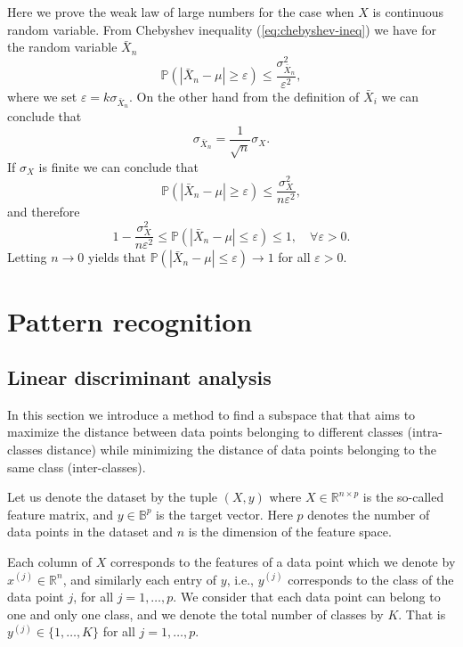 \documentclass[11pt]{article}
\newcommand{\R}{\mathbb{R}}
\newcommand{\B}{\mathbb{B}}
\newcommand{\Pro}{\mathbb{P}}
\begin{document}
Here we prove the weak law of large numbers for the case when $X$ is
continuous random variable. From Chebyshev inequality
(\ref{eq:chebyshev-ineq}) we have for the random variable $\bar{X}_n$
\begin{equation} 
  \Pro(|\bar{X}_n-\mu| \geq \varepsilon) \leq
  \frac{\sigma_{\bar{X}_n}^2}{\varepsilon^2},
\end{equation}
where we set $\varepsilon = k \sigma_{\bar{X}_n}$. On the other hand
from the definition of $\bar{X}_i$ we can conclude that
\begin{equation*}
  \sigma_{\bar{X}_n} = \frac{1}{\sqrt{n}} \sigma_X.
\end{equation*}
If $\sigma_X$ is finite we can conclude that
\begin{equation*} 
  \Pro(|\bar{X}_n-\mu| \geq \varepsilon) \leq \frac{\sigma_{X}^2}{n
    \varepsilon^2},
\end{equation*}
and therefore
\begin{equation} 
  1- \frac{\sigma_{X}^2}{n \varepsilon^2} \leq \Pro(|\bar{X}_n-\mu|
  \leq \varepsilon) \leq 1, \quad \forall \varepsilon > 0.
\end{equation}
Letting $n \rightarrow 0$ yields that $ \Pro(|\bar{X}_n-\mu| \leq
\varepsilon) \rightarrow 1$ for all $\varepsilon > 0$.

\section{Pattern recognition}
\subsection{Linear discriminant analysis}
In this section we introduce a method to find a subspace that that
aims to maximize the distance between data points belonging to
different classes (intra-classes distance) while minimizing the
distance of data points belonging to the same class (inter-classes).

Let us denote the dataset by the tuple $(X, y)$ where $X \in \R^{n
  \times p}$ is the so-called feature matrix, and $y \in \B^{p}$ is
the target vector. Here $p$ denotes the number of data points in the
dataset and $n$ is the dimension of the feature space.

Each column of $X$ corresponds to the features of a data point which
we denote by $x^{(j)} \in \R^{n}$, and similarly each entry of $y$,
i.e., $y^{(j)}$ corresponds to the class of the data point $j$, for
all $j=1,\dots, p$. We consider that each data point can belong to one
and only one class, and we denote the total number of classes by
$K$. That is $y^{(j)} \in \{1,\dots, K\}$ for all $j=1,\dots, p$.
\end{document}
